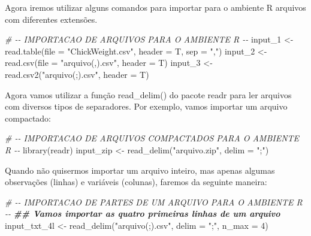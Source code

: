 \documentclass[
]{book}
\newenvironment{Shaded}{\begin{snugshade}}{\end{snugshade}}
\newcommand{\AttributeTok}[1]{\textcolor[rgb]{0.77,0.63,0.00}{#1}}
\newcommand{\CommentTok}[1]{\textcolor[rgb]{0.56,0.35,0.01}{\textit{#1}}}
\newcommand{\DecValTok}[1]{\textcolor[rgb]{0.00,0.00,0.81}{#1}}
\newcommand{\DocumentationTok}[1]{\textcolor[rgb]{0.56,0.35,0.01}{\textbf{\textit{#1}}}}
\newcommand{\FunctionTok}[1]{\textcolor[rgb]{0.00,0.00,0.00}{#1}}
\newcommand{\NormalTok}[1]{#1}
\newcommand{\OtherTok}[1]{\textcolor[rgb]{0.56,0.35,0.01}{#1}}
\newcommand{\StringTok}[1]{\textcolor[rgb]{0.31,0.60,0.02}{#1}}
\begin{document}
Agora iremos utilizar alguns comandos para importar para o ambiente R arquivos com diferentes extensões.

\begin{Shaded}
\begin{Highlighting}[]
\CommentTok{\# {-}{-} IMPORTACAO DE ARQUIVOS PARA O AMBIENTE R {-}{-}}
\NormalTok{input\_1 }\OtherTok{\textless{}{-}} \FunctionTok{read.table}\NormalTok{(}\AttributeTok{file =} \StringTok{"ChickWeight.csv"}\NormalTok{, }\AttributeTok{header =}\NormalTok{ T, }\AttributeTok{sep =} \StringTok{","}\NormalTok{)}
\NormalTok{input\_2 }\OtherTok{\textless{}{-}} \FunctionTok{read.csv}\NormalTok{(}\AttributeTok{file =} \StringTok{"arquivo(,).csv"}\NormalTok{, }\AttributeTok{header =}\NormalTok{ T)}
\NormalTok{input\_3 }\OtherTok{\textless{}{-}} \FunctionTok{read.csv2}\NormalTok{(}\StringTok{"arquivo(;).csv"}\NormalTok{, }\AttributeTok{header =}\NormalTok{ T)}
\end{Highlighting}
\end{Shaded}

Agora vamos utilizar a função read\_delim() do pacote readr para ler arquivos com
diversos tipos de separadores. Por exemplo, vamos importar um arquivo compactado:

\begin{Shaded}
\begin{Highlighting}[]
\CommentTok{\# {-}{-} IMPORTACAO DE ARQUIVOS COMPACTADOS PARA O AMBIENTE R {-}{-}}
\FunctionTok{library}\NormalTok{(readr)}
\NormalTok{input\_zip }\OtherTok{\textless{}{-}} \FunctionTok{read\_delim}\NormalTok{(}\StringTok{"arquivo.zip"}\NormalTok{, }\AttributeTok{delim =} \StringTok{";"}\NormalTok{)}
\end{Highlighting}
\end{Shaded}

Quando não quisermos importar um arquivo inteiro, mas apenas algumas observações (linhas) e variáveis (colunas), faremos da seguinte maneira:

\begin{Shaded}
\begin{Highlighting}[]
\CommentTok{\# {-}{-} IMPORTACAO DE PARTES DE UM ARQUIVO PARA O AMBIENTE R {-}{-}}
\DocumentationTok{\#\# Vamos importar as quatro primeiras linhas de um arquivo}
\NormalTok{input\_txt\_4l }\OtherTok{\textless{}{-}} \FunctionTok{read\_delim}\NormalTok{(}\StringTok{"arquivo(;).csv"}\NormalTok{, }\AttributeTok{delim =} \StringTok{";"}\NormalTok{, }\AttributeTok{n\_max =} \DecValTok{4}\NormalTok{)}
\end{Highlighting}
\end{Shaded}
\end{document}

